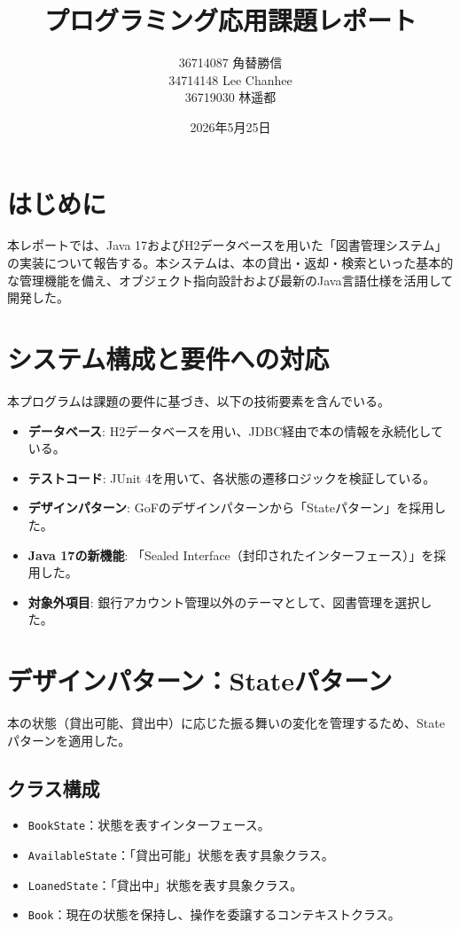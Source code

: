 \documentclass[a4paper,11pt]{ltjsarticle}
\title{プログラミング応用課題レポート}
\author{36714087 角替勝信\\
34714148 Lee Chanhee\\
36719030 林遥都}
\date{2026年5月25日}
\begin{document}
\maketitle

\section{はじめに}
本レポートでは、Java 17およびH2データベースを用いた「図書管理システム」の実装について報告する。本システムは、本の貸出・返却・検索といった基本的な管理機能を備え、オブジェクト指向設計および最新のJava言語仕様を活用して開発した。

\section{システム構成と要件への対応}
本プログラムは課題の要件に基づき、以下の技術要素を含んでいる。
\begin{itemize}
    \item \textbf{データベース}: H2データベースを用い、JDBC経由で本の情報を永続化している。
    \item \textbf{テストコード}: JUnit 4を用いて、各状態の遷移ロジックを検証している。
    \item \textbf{デザインパターン}: GoFのデザインパターンから「Stateパターン」を採用した。
    \item \textbf{Java 17の新機能}: 「Sealed Interface（封印されたインターフェース）」を採用した。
    \item \textbf{対象外項目}: 銀行アカウント管理以外のテーマとして、図書管理を選択した。
\end{itemize}

\section{デザインパターン：Stateパターン}
本の状態（貸出可能、貸出中）に応じた振る舞いの変化を管理するため、Stateパターンを適用した。

\subsection{クラス構成}
\begin{itemize}
    \item \texttt{BookState}：状態を表すインターフェース。
    \item \texttt{AvailableState}：「貸出可能」状態を表す具象クラス。
    \item \texttt{LoanedState}：「貸出中」状態を表す具象クラス。
    \item \texttt{Book}：現在の状態を保持し、操作を委譲するコンテキストクラス。
\end{itemize}
\end{document}
